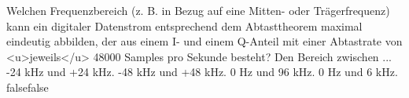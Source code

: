     {Welchen Frequenzbereich (z. B. in Bezug auf eine Mitten- oder Trägerfrequenz) kann ein digitaler Datenstrom entsprechend dem Abtasttheorem maximal eindeutig abbilden, der aus einem I- und einem Q-Anteil mit einer Abtastrate von <u>jeweils</u> 48000 Samples pro Sekunde besteht? Den Bereich zwischen ...}
    {-24 kHz und +24 kHz.}
    {-48 kHz und +48 kHz.}
    {0 Hz und 96 kHz.}
    {0 Hz und 6 kHz.}
    {false}{false}